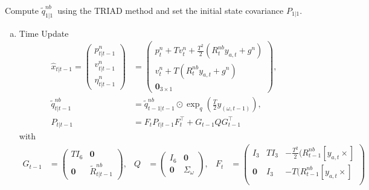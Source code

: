 \documentclass{article}
\begin{document}

\begin{algorithm}
\DontPrintSemicolon %
Compute $\tilde{q}_{1 | 1}^{nb}\,$ using the TRIAD method and set the initial state covariance $P_{1|1}$.\\
 {
  \begin{enumerate}[(a)]
      \item Time Update
\begin{align}
    \hat{x}_{t | t -1} = 
    \begin{pmatrix}
    p_{t | t -1}^n\\
    v_{t | t -1}^n\\
    \hat{\eta}_{t | t -1}^n
    \end{pmatrix} &=
    \begin{pmatrix}
    p_t^n + T v_t^n + \frac{T^2}{2}(R_t^{nb}  y_{a,t} + g^n)\\
    v_t^n + T (R_t^{nb}  y_{a,t} + g^n)\\
    \mathbf{0}_{3\times1}
    \end{pmatrix},\\
    \tilde{q}_{t | t - 1}^{nb} &=  \tilde{q}_{t - 1 | t - 1}^{nb} \odot \exp_q\left(\frac{T}{2} y_(\omega, t-1) \right),\\
    P_{t | t-1} &= F_t P_{t | t-1} F_t^\top + G_{t-1} Q G_{t-1}^\top
\end{align}
with 
\begin{align*}
    G_{t-1} &= 
    \begin{pmatrix}
    T I_6 &\mathbf{0}\\
    \mathbf{0} &\tilde{R}_{t | t - 1}^{nb}
    \end{pmatrix},&
    Q &= \begin{pmatrix}
    I_6 &\mathbf{0}\\
    \mathbf{0} &\Sigma_\omega
    \end{pmatrix},& 
    F_t &= \begin{pmatrix}
    I_3 &T I_3 &-\frac{T^2}{2}(R_{t-1}^{nb}  [y_{a,t} \times] \\
    \mathbf{0} &I_3 & -T(R_{t-1}^{nb}  [y_{a,t} \times] \\

\end{pmatrix}
\end{align*}
\end{enumerate}}
\end{algorithm}
\end{document}
